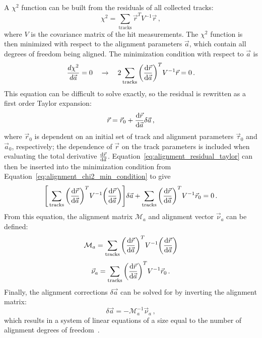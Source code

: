 A $\chi^2$ function can be built from the residuals of all collected tracks:
\begin{equation}
  \chi^2 = \sum\limits_{\textrm{tracks}}\vec{r}^{T}V^{-1}\vec{r}\,,
  \label{eq:alignment_chi2}
\end{equation}
where $V$ is the covariance matrix of the hit measurements.
The $\chi^2$ function is then minimized with respect to the alignment parameters $\vec{a}$, which contain all degrees of freedom being aligned.
The minimization condition with respect to $\vec{a}$ is
\begin{equation}
  \frac{d\chi^2}{d\vec{a}} = 0 \quad\rightarrow\quad 2\sum\limits_{\textrm{tracks}}\bigg(\deriv{\vec{r}}{\vec{a}}\bigg)^{T}V^{-1}\vec{r} = 0\,.
  \label{eq:alignment_chi2_min_condition}
\end{equation}
This equation can be difficult to solve exactly, so the residual is rewritten as a first order Taylor expansion:
\begin{equation}
  \vec{r} = \vec{r}_0+\deriv{\vec{r}}{\vec{a}}\delta\vec{a}\,,
  \label{eq:alignment_residual_taylor}
\end{equation}
where $\vec{r}_0$ is dependent on an initial set of track and alignment parameters $\vec{\tau}_0$ and $\vec{a}_0$, respectively; the dependence of $\vec{r}$ on the track parameters is included when evaluating the total derivative $\frac{\textrm{d}\vec{r}}{\textrm{d}\vec{a}}$.
Equation~\ref{eq:alignment_residual_taylor} can then be inserted into the minimization condition from Equation~\ref{eq:alignment_chi2_min_condition} to give
\begin{equation}
  \Bigg[ \sum\limits_{\textrm{tracks}}\bigg(\deriv{\vec{r}}{\vec{a}}\bigg)^{T}V^{-1}\bigg(\deriv{\vec{r}}{\vec{a}}\bigg) \Bigg]\delta\vec{a} + \sum\limits_{\textrm{tracks}}\bigg(\deriv{\vec{r}}{\vec{a}}\bigg)^{T}V^{-1}\vec{r}_0 = 0\,.
  \label{eq:alignment_chi2_min_taylor}
\end{equation}
From this equation, the alignment matrix $\mathcal{M}_a$ and alignment vector $\vec{\nu}_a$ can be defined:
\begin{equation}
  \mathcal{M}_a = \sum\limits_{\textrm{tracks}}\bigg(\deriv{\vec{r}}{\vec{a}}\bigg)^{T}V^{-1}\bigg(\deriv{\vec{r}}{\vec{a}}\bigg)
  \label{eq:alignment_matrix}
\end{equation}
\begin{equation}
  \vec{\nu}_a = \sum\limits_{\textrm{tracks}}\bigg(\deriv{\vec{r}}{\vec{a}}\bigg)^{T}V^{-1}\vec{r}_0\,.
  \label{eq:alignment_vector}
\end{equation}
Finally, the alignment corrections $\delta\vec{a}$ can be solved for by inverting the alignment matrix:
\begin{equation}
  \delta\vec{a} = -\mathcal{M}_a^{-1}\vec{\nu}_a\,,
  \label{eq:alignment_corrections}
\end{equation}
which results in a system of linear equations of a size equal to the number of alignment degrees of freedom~\cite{2011.alignment-7tev}.

